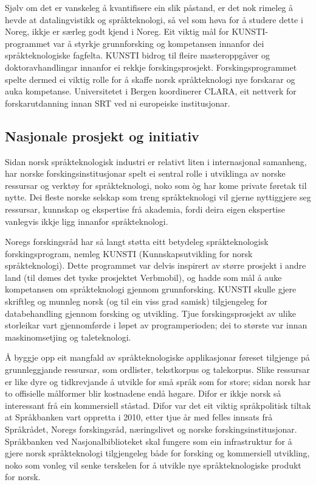 \begin{multicols}{2}
Sjølv om det er vanskeleg å kvantifisere ein slik påstand, er det nok rimeleg å hevde at datalingvistikk og språkteknologi, så vel som høva for å studere dette i Noreg, ikkje er særleg godt kjend i Noreg. Eit viktig mål for KUNSTI-programmet var å styrkje grunnforsking og kompetansen innanfor dei språkteknologiske fagfelta. KUNSTI bidrog til fleire masteroppgåver og doktoravhandlingar innanfor ei rekkje forskingsprosjekt. Forskingsprogrammet spelte dermed ei viktig rolle for å skaffe norsk språkteknologi nye forskarar og auka kompetanse. Universitetet i Bergen koordinerer CLARA, eit nettverk for forskarutdanning innan SRT ved ni europeiske institusjonar.

\subsection{Nasjonale prosjekt og initiativ}

Sidan norsk språkteknologisk industri er relativt liten i internasjonal samanheng, har norske forskingsinstitusjonar spelt ei sentral rolle i utviklinga av norske ressursar og verktøy for språkteknologi, noko som òg har kome private føretak til nytte. 
Dei fleste norske selskap som treng språkteknologi vil gjerne nyttiggjere seg ressursar, kunnskap og ekspertise frå akademia, fordi deira eigen ekspertise vanlegvis ikkje ligg innanfor språkteknologi. 

Noregs forskingsråd har så langt støtta eitt betydeleg språkteknologisk forskingsprogram, nemleg KUNSTI (Kunnskapsutvikling for norsk språkteknologi). 
Dette programmet var delvis inspirert av større prosjekt i andre land (til dømes det tyske prosjektet Verbmobil), og hadde som mål å auke kompetansen om språkteknologi gjennom grunnforsking. KUNSTI skulle gjere skriftleg og munnleg norsk (og til ein viss grad samisk) tilgjengeleg for databehandling gjennom forsking og utvikling. Tjue forskingsprosjekt av ulike storleikar vart gjennomførde i løpet av programperioden; dei to største var innan maskinomsetjing og taleteknologi.


Å byggje opp eit mangfald av språkteknologiske applikasjonar føreset tilgjenge på grunnleggjande ressursar, som ordlister, tekstkorpus og talekorpus. Slike ressursar er like dyre og tidkrevjande å utvikle for små språk som for store; sidan norsk har to offisielle målformer blir kostnadene endå høgare. 
Difor er ikkje norsk så interessant frå ein kommersiell ståstad. Difor var det eit viktig språkpolitisk tiltak at Språkbanken vart oppretta i 2010, etter tjue år med felles innsats frå Språkrådet, Noregs forskingsråd, næringslivet og norske forskingsinstitusjonar. Språkbanken ved Nasjonalbiblioteket skal fungere som ein infrastruktur for å gjere norsk språkteknologi tilgjengeleg både for forsking og kommersiell utvikling, noko som vonleg vil senke terskelen for å utvikle nye språkteknologiske produkt for norsk. 


\end{multicols}
